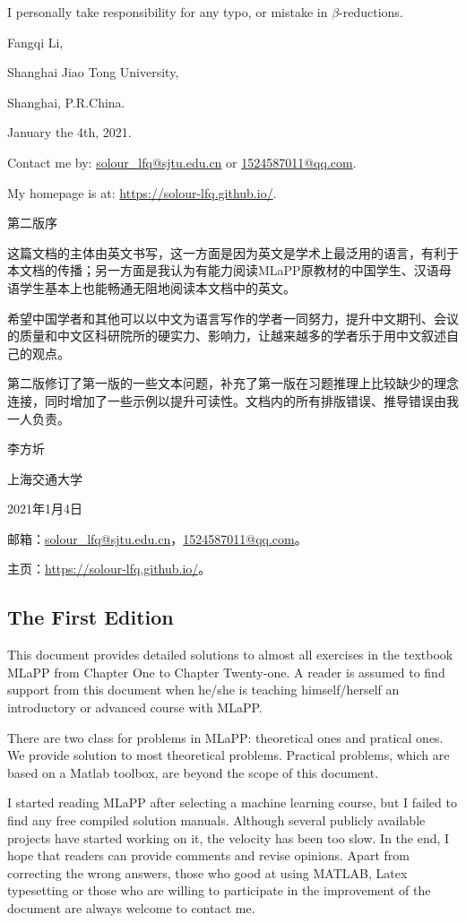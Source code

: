 \documentclass[UTF8]{ctexart}
\begin{document}
I personally take responsibility for any typo, or mistake in $\beta$-reductions.

Fangqi Li,

Shanghai Jiao Tong University,

Shanghai, P.R.China.

January the 4th, 2021.

Contact me by: \url{solour_lfq@sjtu.edu.cn} or \url{1524587011@qq.com}.

My homepage is at: \url{https://solour-lfq.github.io/}.

\newpage
\centerline{\Large{第二版序}}

这篇文档的主体由英文书写，这一方面是因为英文是学术上最泛用的语言，有利于本文档的传播；另一方面是我认为有能力阅读MLaPP原教材的中国学生、汉语母语学生基本上也能畅通无阻地阅读本文档中的英文。

希望中国学者和其他可以以中文为语言写作的学者一同努力，提升中文期刊、会议的质量和中文区科研院所的硬实力、影响力，让越来越多的学者乐于用中文叙述自己的观点。

第二版修订了第一版的一些文本问题，补充了第一版在习题推理上比较缺少的理念连接，同时增加了一些示例以提升可读性。文档内的所有排版错误、推导错误由我一人负责。

李方圻

上海交通大学

2021年1月4日

邮箱：\url{solour_lfq@sjtu.edu.cn}，\url{1524587011@qq.com}。

主页：\url{https://solour-lfq.github.io/}。

\newpage
\subsection{The First Edition}
This document provides detailed solutions to almost all exercises in the textbook MLaPP from Chapter One to Chapter Twenty-one.
A reader is assumed to find support from this document when he/she is teaching himself/herself an introductory or advanced course with MLaPP.

There are two class for problems in MLaPP: theoretical ones and pratical ones.
We provide solution to most theoretical problems.
Practical problems, which are based on a Matlab toolbox, are beyond the scope of this document.

I started reading MLaPP after selecting a machine learning course, but I failed to find any free compiled solution manuals.
Although several publicly available projects have started working on it, the velocity has been too slow.
In the end, I hope that readers can provide comments and revise opinions. Apart from correcting the wrong answers, those who good at using MATLAB, Latex typesetting or those who are willing to participate in the improvement of the document are always welcome to contact me.
\end{document}

